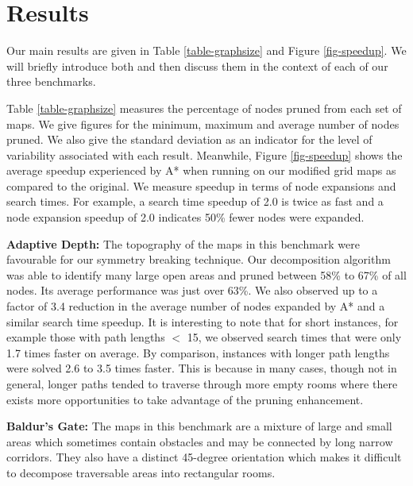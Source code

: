 \section{Results}
\label{sec-results}
Our main results are given in Table \ref{table-graphsize} and
Figure \ref{fig-speedup}.
We will briefly introduce both and then discuss them in the context
of each of our three benchmarks.
\par
Table \ref{table-graphsize} measures the percentage of nodes
pruned from each set of maps.  We give figures for the minimum,
maximum and average number of nodes pruned.  
We also give the standard deviation as an indicator
for the level of variability associated with each result. 
Meanwhile, Figure \ref{fig-speedup} shows the average speedup experienced
by A* when running on our modified grid maps as compared to the
original.  We measure speedup in terms of node expansions and search
times.  For example, a search time speedup of 2.0 is twice as fast and
a node expansion speedup of 2.0 indicates 50\% fewer nodes were expanded.

\textbf{Adaptive Depth:} 
The topography of the maps in this benchmark were favourable for
our symmetry breaking technique.  Our decomposition algorithm was
able to identify many large open areas and pruned between 58\%
to 67\% of all nodes.  Its average performance was just over
63\%.  We also observed up to a factor of 3.4 reduction in the average 
number of nodes expanded by A* and a similar search time speedup.
It is interesting to note that for short instances, for example
those with path lengths $<$ 15, we observed search times that were only 1.7
times faster on average. 
By comparison, instances with
longer path lengths were solved 2.6 to 3.5 times faster.  
This is because in many cases, though not in general, longer paths 
tended to traverse through more empty rooms where there exists more 
opportunities to take advantage of the pruning enhancement.
%
\par
\textbf{Baldur's Gate: }
The maps in this benchmark are a mixture of large and small areas
which sometimes contain obstacles and may be connected by long narrow 
corridors.
They also have a distinct 45-degree orientation which makes
it difficult to decompose traversable areas into rectangular rooms.
